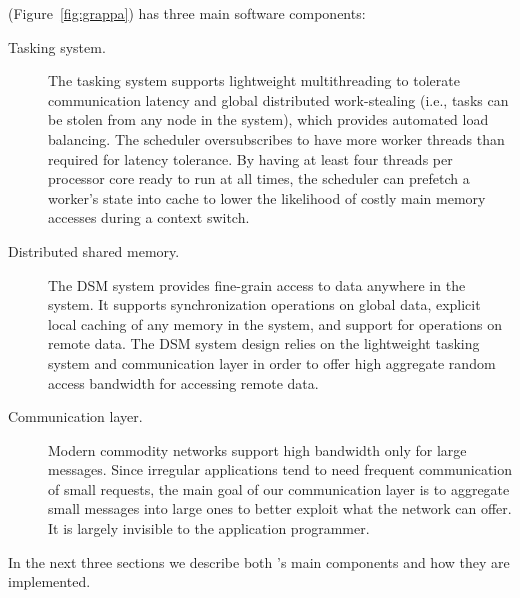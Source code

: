 \Grappa (Figure~\ref{fig:grappa}) has three main software components:
\begin{description}

\item [Tasking system.] The tasking system supports lightweight multithreading to tolerate communication latency and global distributed work-stealing (i.e., tasks can be stolen from any node in the system), which provides automated load balancing. The scheduler oversubscribes to have more worker threads than required for latency tolerance. By having at least four threads per processor core ready to run at all times, the scheduler can prefetch a worker's state into cache to lower the likelihood of costly main memory accesses during a context switch.

\item[Distributed shared memory.] The DSM system provides
fine-grain access to data anywhere in the system. It supports synchronization
operations on global data, explicit local caching of any memory in the system,
and support for operations on remote data.
The DSM system design relies on the lightweight tasking system and
communication layer in order to offer high aggregate random
access bandwidth for accessing remote data.

\item[Communication layer.] Modern commodity networks
support high bandwidth only for large messages. Since irregular applications
tend to need frequent communication of small requests, the main goal of our
communication layer is to aggregate small messages into large ones to better
exploit what the network can offer. It is largely invisible to the application
programmer.


\end{description}



In the next three sections we describe both \Grappa's main components and how they are implemented.

